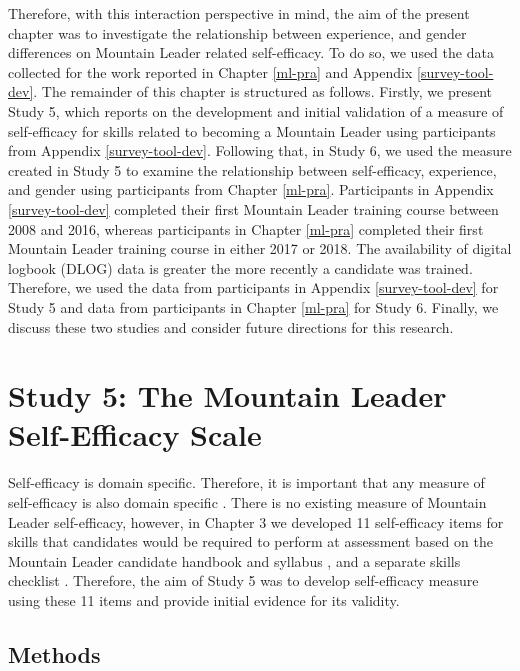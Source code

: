 \documentclass[
  12pt,
  a4paper,
]{book}
\begin{document}
Therefore, with this interaction perspective in mind, the aim of the present chapter was to investigate the relationship between experience, and gender differences on Mountain Leader related self-efficacy. To do so, we used the data collected for the work reported in Chapter \ref{ml-pra} and Appendix \ref{survey-tool-dev}. The remainder of this chapter is structured as follows. Firstly, we present Study 5, which reports on the development and initial validation of a measure of self-efficacy for skills related to becoming a Mountain Leader using participants from Appendix \ref{survey-tool-dev}. Following that, in Study 6, we used the measure created in Study 5 to examine the relationship between self-efficacy, experience, and gender using participants from Chapter \ref{ml-pra}. Participants in Appendix \ref{survey-tool-dev} completed their first Mountain Leader training course between 2008 and 2016, whereas participants in Chapter \ref{ml-pra} completed their first Mountain Leader training course in either 2017 or 2018. The availability of digital logbook (DLOG) data is greater the more recently a candidate was trained. Therefore, we used the data from participants in Appendix \ref{survey-tool-dev} for Study 5 and data from participants in Chapter \ref{ml-pra} for Study 6. Finally, we discuss these two studies and consider future directions for this research.

\hypertarget{study-5}{%
\section{Study 5: The Mountain Leader Self-Efficacy Scale}\label{study-5}}

Self-efficacy is domain specific. Therefore, it is important that any measure of self-efficacy is also domain specific \citep{Bandura2006}. There is no existing measure of Mountain Leader self-efficacy, however, in Chapter 3 we developed 11 self-efficacy items for skills that candidates would be required to perform at assessment based on the Mountain Leader candidate handbook and syllabus \citep{MTUK2015a}, and a separate skills checklist \citep{MTUK2015}. Therefore, the aim of Study 5 was to develop self-efficacy measure using these 11 items and provide initial evidence for its validity.

\hypertarget{study-5-methods}{%
\subsection{Methods}\label{study-5-methods}}
\end{document}
